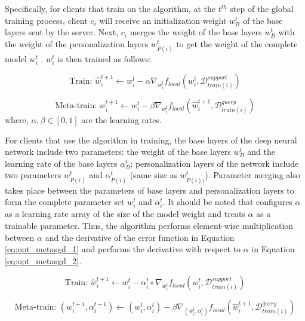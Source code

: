 \documentclass[runningheads]{llncs}
\begin{document}
Specifically, for clients that train on the  algorithm, at the $t^{th}$ step of the global training process, client $c_i$ will receive an initialization weight $w_B^t$ of the base layers sent by the server. Next, $c_i$ merges the weight of the base layers $w_B^t$ with the weight of the personalization layers $w_{P(i)}^t$ to get the weight of the complete model $w_i^t$ . $w_i^t$ is then trained as follows:

\begin{dmath}
    \text{Train: } \hat{w}_{i}^{t+1} \gets w_{i}^t - \alpha\nabla_{w_i^t} f_{local}\left(w_{i}^t, \mathcal{D}_{train(i)}^{support}\right)
\end{dmath}

\begin{dmath}
    \text{Meta-train: } w_{i}^{t+1} \gets w_{i}^t - \beta\nabla_{w_i^t} f_{local}\left(\hat{w}_{i}^{t+1}, \mathcal{D}_{train(i)}^{query}\right)
\end{dmath} where, $\alpha, \beta\in [0,1]$ are the learning rates.

For clients that use the  algorithm in training, the base layers of the deep neural network include two parameters: the weight of the base layers $w_B^{t}$ and the learning rate of the base layers $\alpha_B^{t}$; personalization layers of the network include two parameters $w_{P(i)}^{t}$ and $\alpha_{P(i)}^{t}$ (same size as $w_{P(i) )}^{t}$). Parameter merging also takes place between the parameters of base layers and personalization layers to form the complete parameter set $w_i^t$ and $\alpha_i^t$. It should be noted that  configures $\alpha$ as a learning rate array of the size of the model weight and treats $\alpha$ as a trainable parameter. Thus, the algorithm performs element-wise multiplication between $\alpha$ and the derivative of the error function in Equation \ref{eq:opt_metasgd_1} and performs the derivative with respect to $\alpha$ in Equation \ref{eq:opt_metasgd_2}.

\begin{dmath}
    \label{eq:opt_metasgd_1}
    \text{Train: } \hat{w}_{i}^{t+1} \gets w_{i}^t - \alpha_i^t\circ\nabla_{w_i^t} f_{local}\left(w_{i}^t, \mathcal{D}_{train(i)}^{support}\right)
\end{dmath}

\begin{dmath}
    \label{eq:opt_metasgd_2}
    \text{Meta-train: } (w_{i}^{t+1}, \alpha_i^{t+1}) \gets (w_{i}^t, \alpha_{i}^{t}) - \beta\nabla_{(w_i^t, \alpha_i^t)} f_{local}\left(\hat{w}_{i}^{t+1}, \mathcal{D}_{train(i)}^{query}\right)
\end{dmath}
\end{document}
